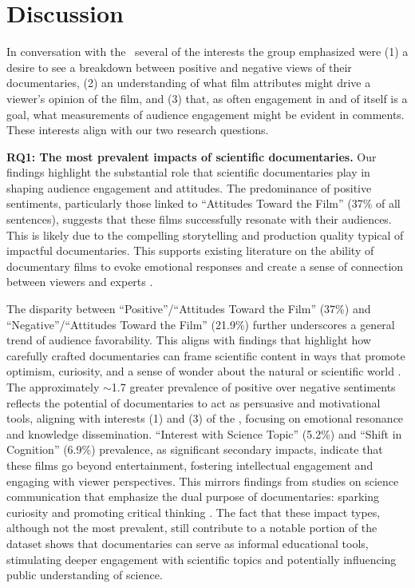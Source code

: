 \section{Discussion}

In conversation with the \avlshort\, several of the interests the group emphasized were (1) a desire to see a breakdown between positive and negative views of their documentaries, (2) an understanding of what film attributes might drive a viewer's opinion of the film, and (3) that, as often engagement in and of itself is a goal, what measurements of audience engagement might be evident in comments.
These interests align with our two research questions.

\vspace{0.2cm}
\noindent\textbf{RQ1: The most prevalent impacts of scientific documentaries. } 
Our findings highlight the substantial role that scientific documentaries play in shaping audience engagement and attitudes. The predominance of positive sentiments, particularly those linked to ``Attitudes Toward the Film'' (37\% of all sentences), suggests that these films successfully resonate with their audiences. This is likely due to the compelling storytelling and production quality typical of impactful documentaries. This supports existing literature on the ability of documentary films to evoke emotional responses and create a sense of connection between viewers and experts \cite{nisbet2009documentary,corner2002performing}.

The disparity between ``Positive''/``Attitudes Toward the Film'' (37\%) and ``Negative''/``Attitudes Toward the Film'' (21.9\%) further underscores a general trend of audience favorability. This aligns with findings that highlight how carefully crafted documentaries can frame scientific content in ways that promote optimism, curiosity, and a sense of wonder about the natural or scientific world \cite{gregory1998science}. The approximately $\sim$1.7 greater prevalence of positive over negative sentiments reflects the potential of documentaries to act as persuasive and motivational tools, aligning with interests (1) and (3) of the \avlshort, focusing on emotional resonance and knowledge dissemination.
%
``Interest with Science Topic'' (5.2\%) and ``Shift in Cognition'' (6.9\%) prevalence, as significant secondary impacts, indicate that these films go beyond entertainment, fostering intellectual engagement and engaging with viewer perspectives. This mirrors findings from studies on science communication that emphasize the dual purpose of documentaries: sparking curiosity and promoting critical thinking \cite{dahlstrom2014using}.
The fact that these impact types, although not the most prevalent, still contribute to a notable portion of the dataset shows that documentaries can serve as informal educational tools, stimulating deeper engagement with scientific topics and potentially influencing public understanding of science.

